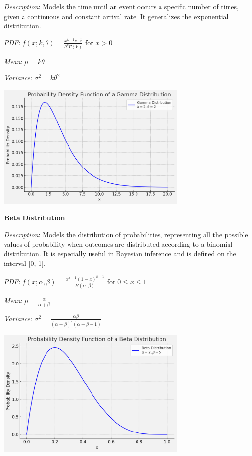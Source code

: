 \documentclass{article}
\begin{document}
\begin{multicols}{2}
\begin{mdframed}
    \textit{Description}: Models the time until an event occurs a specific number of times, given a continuous and constant arrival rate. It generalizes the exponential distribution.
    
    \textit{PDF}: $f(x; k, \theta) = \frac{x^{k-1}e^{-\frac{x}{\theta}}}{\theta^k \Gamma(k)}$ for $x > 0$
    
    \textit{Mean}: $\mu = k\theta$
    
    \textit{Variance}: $\sigma^2 = k\theta^2$
    
    \begin{center}
      \includegraphics*[width=0.7\textwidth]{gamma.png}
    \end{center}
    
\end{mdframed}
\newpage
\begin{mdframed}
    \textbf{Beta Distribution}
    
    \textit{Description}: Models the distribution of probabilities, representing all the possible values of probability when outcomes are distributed according to a binomial distribution. It is especially useful in Bayesian inference and is defined on the interval [0, 1].
    
    \textit{PDF}: $f(x; \alpha, \beta) = \frac{x^{\alpha-1}(1-x)^{\beta-1}}{B(\alpha, \beta)}$ for $0 \leq x \leq 1$
    
    \textit{Mean}: $\mu = \frac{\alpha}{\alpha + \beta}$
    
    \textit{Variance}: $\sigma^2 = \frac{\alpha\beta}{(\alpha + \beta)^2(\alpha + \beta + 1)}$
    
    \begin{center}
      \includegraphics*[width=0.7\textwidth]{beta.png}
    \end{center}
    

\end{mdframed}
\end{multicols}
\end{document}

